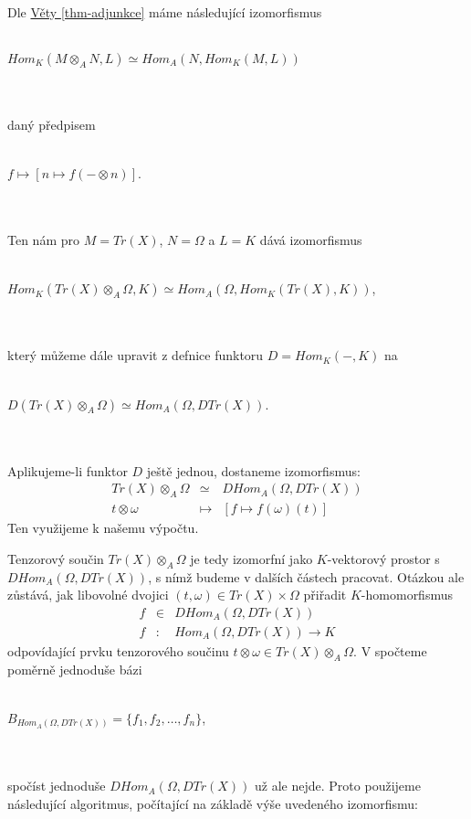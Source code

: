       \paragraph{ } Dle \hyperref[thm-adjunkce]{Věty \ref*{thm-adjunkce}}
      máme následující izomorfismus \\\\
      \centerline{$Hom_K(M\otimes_A N,L)\simeq Hom_A(N, Hom_K(M,L))$}
      \\\\
      daný předpisem \\\\
      \centerline{$f \mapsto [n \mapsto f(-\otimes n)]$.}
      \\\\
      Ten nám pro $M=Tr(X)$, $N=\Omega$ a $L=K$ dává izomorfismus \\\\
      \centerline{$Hom_K(Tr(X)\otimes_A \Omega,K)\simeq Hom_A(\Omega, 
      Hom_K(Tr(X),K))$,}
      \\\\      
      který můžeme dále upravit z defnice funktoru $D=Hom_K(-,K)$ na  \\\\
      \centerline{$D(Tr(X)\otimes_A \Omega)\simeq Hom_A(\Omega,DTr(X))$.}
      \\\\    
      Aplikujeme-li funktor $D$ ještě jednou, dostaneme izomorfismus:
      \begin{eqnarray}
        Tr(X)\otimes_A\Omega &\simeq& DHom_A(\Omega,DTr(X))  \nonumber \\
        t \otimes\omega &\mapsto& \left[f\mapsto f(\omega)(t)\right] \nonumber
      \end{eqnarray}
      Ten využijeme k našemu výpočtu.
            
      Tenzorový součin $Tr(X)\otimes_A \Omega$ je tedy izomorfní jako $K$-vektorový prostor s 
      $DHom_A(\Omega,DTr(X))$, s nímž budeme v dalších částech pracovat. Otázkou ale 
      zůstává, jak libovolné dvojici $(t,\omega)\in Tr(X)\times\Omega$ přiřadit $K$-homomorfismus 
      \begin{eqnarray}
        f &\in& DHom_A(\Omega,DTr(X)) \nonumber \\
        f &:& Hom_A(\Omega,DTr(X))\rightarrow K \nonumber
      \end{eqnarray}
      odpovídající 
      prvku tenzorového součinu $t\otimes\omega\in Tr(X)\otimes_A\Omega$.      
      V \cite{QPA} spočteme poměrně jednoduše bázi\\\\
      \centerline{$B_{Hom_A(\Omega,DTr(X))}=\{f_1,f_2,\ldots,f_n\}$,} \\\\
      spočíst jednoduše $DHom_A(\Omega,DTr(X))$ už ale nejde. 
      Proto použijeme následující algoritmus, počítající na základě výše 
      uvedeného izomorfismu:
      
